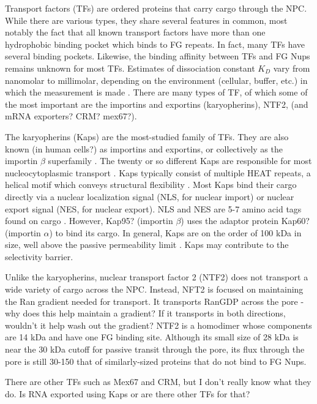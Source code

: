 Transport factors (TFs) are ordered proteins that carry cargo through the NPC.  While there are various types, they share several features in common, most notably the fact that all known transport factors have more than one hydrophobic binding pocket which binds to FG repeats.  In fact, many TFs have several binding pockets.  Likewise, the binding affinity between TFs and FG Nups remains unknown for most TFs.  Estimates of dissociation constant $K_D$ vary from nanomolar to millimolar, depending on the environment (cellular, buffer, etc.) in which the measurement is made \cite{things}. There are many types of TF, of which some of the most important are the importins and exportins (karyopherins), NTF2, (and mRNA exporters? CRM? mex67?).

The karyopherins (Kaps) are the most-studied family of TFs.  They are also known (in human cells?) as importins and exportins, or collectively as the importin $\beta$ superfamily \cite{tu11}.  The twenty or so different Kaps are responsible for most nucleocytoplasmic transport \cite{kapinos17}.  Kaps typically consist of multiple HEAT repeats, a helical motif which conveys structural flexibility \cite{yoshimura16}.  Most Kaps bind their cargo directly via a nuclear localization signal (NLS, for nuclear import) or nuclear export signal (NES, for nuclear export).  NLS and NES are 5-7 amino acid tags found on cargo \cite{}.  However, Kap95? (importin $\beta$) uses the adaptor protein Kap60? (importin $\alpha$) to bind its cargo. In general, Kaps are on the order of 100 kDa in size, well above the passive permeability limit \cite{}. Kaps may contribute to the selectivity barrier.

Unlike the karyopherins, nuclear transport factor 2 (NTF2) does not transport a wide variety of cargo across the NPC.  Instead, NFT2 is focused on maintaining the Ran gradient needed for transport.  It transports RanGDP across the pore - why does this help maintain a gradient?  If it transports in both directions, wouldn't it help wash out the gradient?  NTF2 is a homodimer whose components are 14 kDa and have one FG binding site.  Although its small size of 28 kDa is near the 30 kDa cutoff for passive transit through the pore, its flux through the pore is still 30-150 that of similarly-sized proteins that do not bind to FG Nups.

There are other TFs such as Mex67 and CRM, but I don't really know what they do.  Is RNA exported using Kaps or are there other TFs for that?

